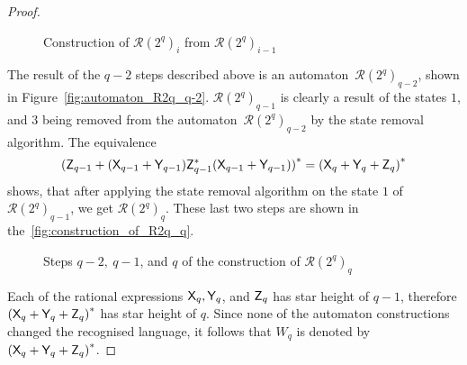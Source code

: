 \begin{proof}
    \begin{figure}[h]%
        \centerline{
            \hspace{-25pt}%
        }
        \caption{Construction of ${\mathcal{R}(2^q)}_i$ from ${\mathcal{R}(2^q)}_{i-1}$}\label{fig:construction_of_R2q_i}%
    \end{figure}

    The result of the $q-2$ steps described above is an automaton~${\mathcal{R}(2^q)}_{q-2}$, shown in Figure~\ref*{fig:automaton_R2q_q-2}. ${\mathcal{R}(2^q)}_{q-1}$ is clearly a result of the states $1$, and $3$ being removed from the automaton~${\mathcal{R}(2^q)}_{q-2}$ by the state removal algorithm. The equivalence
    \[
        {({\mathsf{Z}}_{q-1} + {({\mathsf{X}}_{q-1} + {\mathsf{Y}}_{q-1})}{\mathsf{Z}}_{q-1}^*{({\mathsf{X}}_{q-1} + {\mathsf{Y}}_{q-1})})}^* = {({\mathsf{X}}_q + {\mathsf{Y}}_q + {\mathsf{Z}}_q)}^*
    \]
    shows, that after applying the state removal algorithm on the state $1$ of ${\mathcal{R}(2^q)}_{q-1}$, we get ${\mathcal{R}(2^q)}_{q}$. These last two steps are shown in the~\autoref*{fig:construction_of_R2q_q}.

    \begin{figure}[h]%
        \centerline{
            \hspace{-25pt}%
        }
        \caption{Steps $q-2, \: q-1$, and $q$ of the construction of ${\mathcal{R}(2^q)}_q$}\label{fig:construction_of_R2q_q}%
    \end{figure}

    Each of the rational expressions ${\mathsf{X}}_q, {\mathsf{Y}}_q$, and ${\mathsf{Z}}_q$ has star height of $q-1$, therefore ${({\mathsf{X}}_q + {\mathsf{Y}}_q + {\mathsf{Z}}_q)}^*$ has star height of $q$. Since none of the automaton constructions changed the recognised language, it follows that $W_q$ is denoted by ${({\mathsf{X}}_q + {\mathsf{Y}}_q + {\mathsf{Z}}_q)}^*$.
\end{proof}

